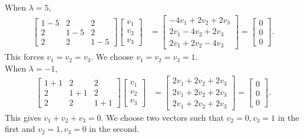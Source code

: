 \documentclass[10pt]{article}
\begin{document}
        When $\lambda = 5$,
        \begin{align*}
                \begin{bmatrix}
                        1 - 5 & 2 & 2 \\ 2 & 1 - 5 & 2 \\ 2 & 2 & 1 - 5
                \end{bmatrix}
                \begin{bmatrix}
                        v_{1} \\ v_{2} \\ v_{3}
                \end{bmatrix}
                &= \begin{bmatrix}
                        -4v_1 + 2v_2 + 2v_3 \\
                        2v_1 - 4v_2 + 2v_3 \\
                        2v_1 + 2v_2 - 4v_3
                \end{bmatrix}
                = \begin{bmatrix}
                        0 \\ 0 \\ 0
                \end{bmatrix}.
        \end{align*}
        This forces $v_1 = v_2 = v_3$. We choose $v_1 = v_2 = v_3 = 1$. \\

        When $\lambda = -1$,
        \begin{align*}
                \begin{bmatrix}
                        1 + 1 & 2 & 2 \\ 2 & 1 + 1 & 2 \\ 2 & 2 & 1 + 1
                \end{bmatrix}
                \begin{bmatrix}
                        v_{1} \\ v_{2} \\ v_{3}
                \end{bmatrix}
                &= \begin{bmatrix}
                        2v_1 + 2v_2 + 2v_3 \\
                        2v_1 + 2v_2 + 2v_3 \\
                        2v_1 + 2v_2 + 2v_3
                \end{bmatrix}
                = \begin{bmatrix}
                        0 \\ 0 \\ 0
                \end{bmatrix}.
        \end{align*}
        This gives $v_1 + v_2 + v_3 = 0$. We choose two vectors such that $v_2 = 0, v_3 = 1$ in the first and $v_2 = 1, v_3 = 0$ in the second. \\
\end{document}
